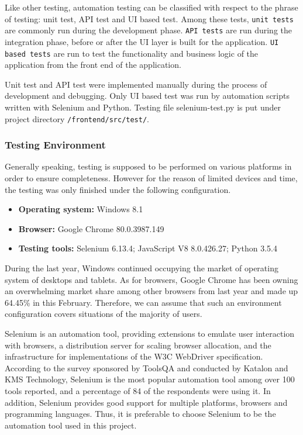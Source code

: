 Like other testing, automation testing can be classified with respect to the phrase of testing: unit test, API test and UI based test. Among these tests, \verb|unit tests| are commonly run during the development phase. \verb|API tests| are run during the integration phase, before or after the UI layer is built for the application. \verb|UI based tests| are run to test the functionality and business logic of the application from the front end of the application\cite{automation-testing}.

Unit test and API test were implemented manually during the process of development and debugging. Only UI based test was run by automation scripts written with Selenium and Python. Testing file selenium-test.py is put under project directory \texttt{/frontend/src/test/}.

\subsubsection{Testing Environment}

Generally speaking, testing is supposed to be performed on various platforms in order to ensure completeness. However for the reason of limited devices and time, the testing was only finished under the following configuration.

\begin{itemize}
    \item \textbf{Operating system:} Windows 8.1
    \item \textbf{Browser:} Google Chrome 80.0.3987.149
    \item \textbf{Testing tools:} Selenium 6.13.4; JavaScript V8 8.0.426.27; Python 3.5.4
\end{itemize}

During the last year, Windows continued occupying the market of operating system of desktops and tablets\cite{desktop-tablet-os-market-share}. As for browsers, Google Chrome has been owning an overwhelming market share among other browsers from last year and made up 64.45\% in this February\cite{browser-market-share-worldwide}. Therefore, we can assume that such an environment configuration covers situations of the majority of users.

Selenium is an automation tool, providing extensions to emulate user interaction with browsers, a distribution server for scaling browser allocation, and the infrastructure for implementations of the W3C WebDriver specification\cite{selenium-project}. According to the survey sponsored by ToolsQA and conducted by Katalon and KMS Technology, Selenium is the most popular automation tool among over 100 tools reported, and a percentage of 84 of the respondents were using it\cite{automation-tools-survey}. In addition, Selenium provides good support for multiple platforms, browsers and programming languages. Thus, it is preferable to choose Selenium to be the automation tool used in this project.


